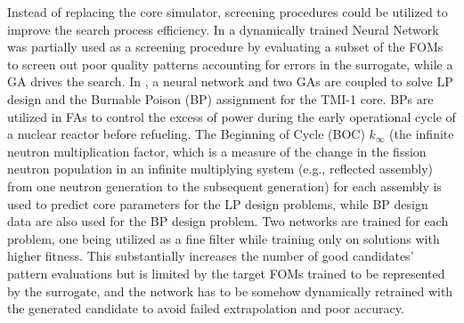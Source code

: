 \documentclass[a4paper]{article}
\begin{document}
Instead of replacing the core simulator, screening procedures could be utilized to improve the search process efficiency. In \cite{yamamoto2003application} a dynamically trained Neural Network was partially used as a screening procedure by evaluating a subset of the FOMs to screen out poor quality patterns accounting for errors in the surrogate, while a GA drives the search. In \cite{gocalvez2006sensitivity}, a neural network and two GAs are coupled to solve 
LP design and the Burnable Poison (BP) assignment for the TMI-1 core. BPs are utilized in FAs to control the excess of power during the early operational cycle of a nuclear reactor before refueling. The Beginning of Cycle (BOC) $k_{\infty}$ (the infinite neutron multiplication factor, which is a measure of the change in the fission neutron population in an infinite multiplying system (e.g., reflected assembly) from one neutron generation to the subsequent generation) for each assembly is used to predict core parameters for the LP design problems, while BP design data are also used for the BP design problem. Two networks are trained for each problem, one being utilized as a fine filter while training only on solutions with higher fitness. This substantially increases the number of good candidates' pattern evaluations but is limited by the target FOMs trained to be represented by the surrogate, and the network has to be somehow dynamically retrained with the generated candidate to avoid failed extrapolation and poor accuracy. 
\end{document}
